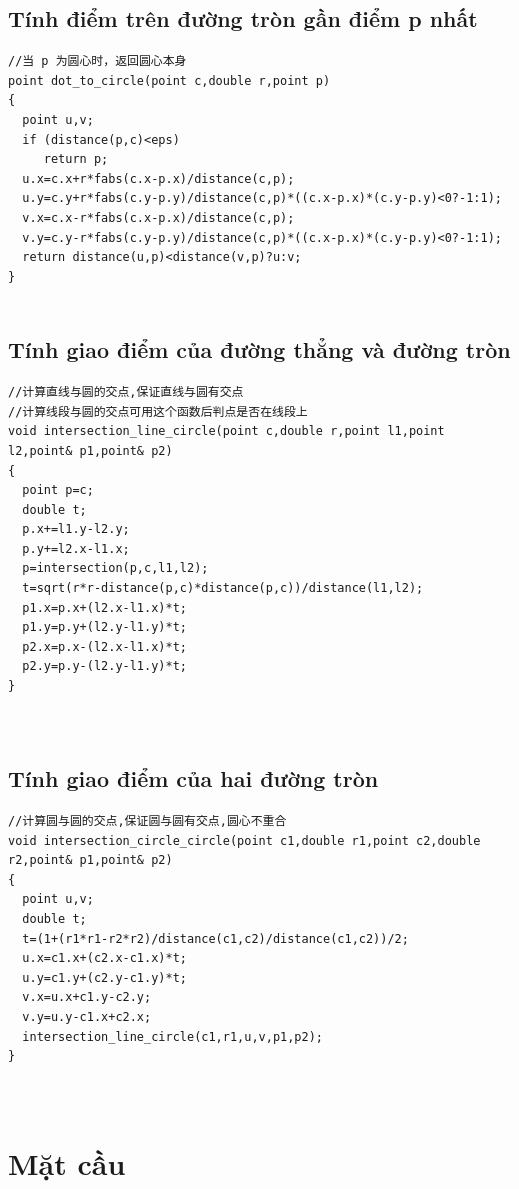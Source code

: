 \documentclass[11pt]{article}
\begin{document}
\subsection{Tính điểm trên đường tròn gần điểm p nhất}
\begingroup
\scriptsize
\begin{verbatim}
//当 p 为圆心时，返回圆心本身
point dot_to_circle(point c,double r,point p)
{
  point u,v;
  if (distance(p,c)<eps)
     return p;
  u.x=c.x+r*fabs(c.x-p.x)/distance(c,p);
  u.y=c.y+r*fabs(c.y-p.y)/distance(c,p)*((c.x-p.x)*(c.y-p.y)<0?-1:1);
  v.x=c.x-r*fabs(c.x-p.x)/distance(c,p);
  v.y=c.y-r*fabs(c.y-p.y)/distance(c,p)*((c.x-p.x)*(c.y-p.y)<0?-1:1);
  return distance(u,p)<distance(v,p)?u:v;
}


\end{verbatim}
\endgroup
\subsection{Tính giao điểm của đường thẳng và đường tròn}
\begingroup
\scriptsize
\begin{verbatim}
//计算直线与圆的交点,保证直线与圆有交点
//计算线段与圆的交点可用这个函数后判点是否在线段上
void intersection_line_circle(point c,double r,point l1,point l2,point& p1,point& p2)
{
  point p=c;
  double t;
  p.x+=l1.y-l2.y;
  p.y+=l2.x-l1.x;
  p=intersection(p,c,l1,l2);
  t=sqrt(r*r-distance(p,c)*distance(p,c))/distance(l1,l2);
  p1.x=p.x+(l2.x-l1.x)*t;
  p1.y=p.y+(l2.y-l1.y)*t;
  p2.x=p.x-(l2.x-l1.x)*t;
  p2.y=p.y-(l2.y-l1.y)*t;
}



\end{verbatim}
\endgroup
\subsection{Tính giao điểm của hai đường tròn}
\begingroup
\scriptsize
\begin{verbatim}
//计算圆与圆的交点,保证圆与圆有交点,圆心不重合
void intersection_circle_circle(point c1,double r1,point c2,double r2,point& p1,point& p2)
{
  point u,v;
  double t;
  t=(1+(r1*r1-r2*r2)/distance(c1,c2)/distance(c1,c2))/2;
  u.x=c1.x+(c2.x-c1.x)*t;
  u.y=c1.y+(c2.y-c1.y)*t;
  v.x=u.x+c1.y-c2.y;
  v.y=u.y-c1.x+c2.x;
  intersection_line_circle(c1,r1,u,v,p1,p2);
}



\end{verbatim}
\endgroup
\section{Mặt cầu}
\end{document}
